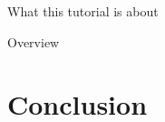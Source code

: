 \documentclass[t,aspectratio=169]{beamer}
\begin{document}
\begin{frame}{What this tutorial is about}
\begin{minipage}[t]{0.25\linewidth}

\end{minipage}

\end{frame}


\begin{frame}{Overview}
\tableofcontents
\end{frame}












\section*{Conclusion}
\end{document}
